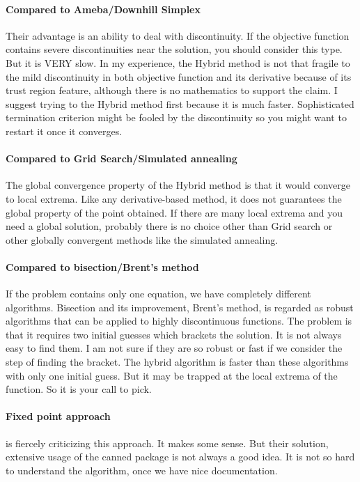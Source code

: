 \documentclass[12pt]{article}
\begin{document}
\paragraph{Compared to Ameba/Downhill Simplex } Their advantage is an ability to deal with
discontinuity. If the objective function contains severe discontinuities near the solution, you
should consider this type. But it is VERY slow. In my experience, the Hybrid method is not that fragile to the mild discontinuity in both objective function and its derivative because of its trust region feature, although there is no mathematics to support the claim. I suggest trying to the Hybrid method first because it is much
faster. Sophisticated termination criterion might be fooled by the discontinuity so you might want
to restart it once it converges.

\paragraph{Compared to Grid Search/Simulated annealing}
The global convergence property of the Hybrid method is that it would converge to local
extrema. Like any derivative-based method, it does not guarantees the global property of the point
obtained. If there are many local extrema and you need a global solution, probably there is no
choice other than Grid search or other globally convergent methods like the simulated annealing.

\paragraph{Compared to bisection/Brent's method} If the problem contains only one equation, we
have completely different algorithms. Bisection and its improvement, Brent's method, is regarded
as robust algorithms that can be applied to highly discontinuous functions. The problem is that it
requires two initial guesses which brackets the solution. It is not always easy to find them. I am
not sure if they are so robust or fast if we consider the step of finding the bracket.  The hybrid
algorithm is faster than these algorithms with only one initial guess. But it may be trapped at
the local extrema of the function. So it is your call to pick.

\paragraph{Fixed point approach} \cite{SuJudd2008} is fiercely criticizing this approach. It
makes some sense. But their solution, extensive usage of the canned package is not always a good idea. It is
not so hard to understand the algorithm, once we have nice documentation. 
\end{document}
